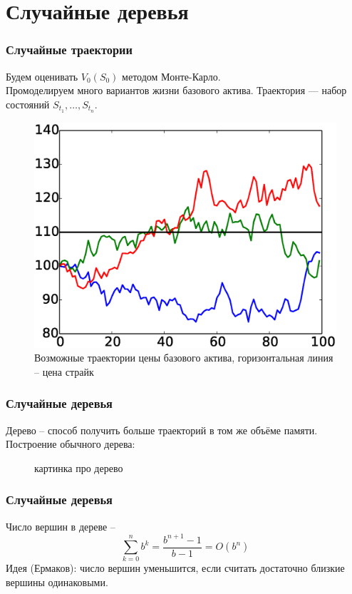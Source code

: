 \documentclass[unicode, notheorems]{beamer}
\begin{document}
\section{Случайные деревья}
    \begin{frame}
        \frametitle{Случайные траектории}
        Будем оценивать $V_0(S_0)$ методом Монте-Карло.
        \\ Промоделируем много вариантов жизни базового актива. Траектория --- набор состояний $S_{t_1}, \ldots, S_{t_n}$.
        \begin{figure}[h]
            \includegraphics[height=0.5\paperheight]{traces}
            \caption{Возможные траектории цены базового актива, горизонтальная линия -- цена страйк}
            \label{fig:traces}
        \end{figure}
    \end{frame}

\begin{frame}
    \frametitle{Случайные деревья}
    Дерево -- способ получить больше траекторий в том же объёме памяти. Построение обычного дерева:
    \begin{figure}[h]
        картинка про дерево
    \end{figure}
\end{frame}

\begin{frame}
    \frametitle{Случайные деревья}
    Число вершин в дереве -- $$\sum_{k=0}^n b^k = \frac{b^{n+1} - 1}{b-1} = O(b^n)$$
    Идея (Ермаков): число вершин уменьшится, если считать достаточно близкие вершины одинаковыми.
\end{frame}
\end{document}
